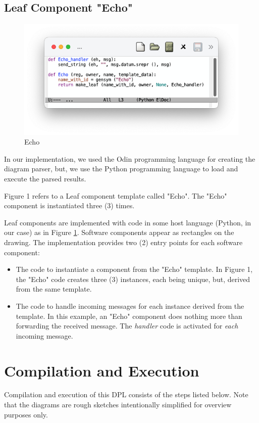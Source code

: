 \documentclass[10pt,anonymous,review]{acmart}
\begin{document}
\subsection{Leaf Component "Echo"}
\begin{figure}
    \includegraphics[trim=1.7cm 2cm 1.7cm 1.5cm, clip, scale=0.4]{./media/echo.png}
    \caption{Echo}
    \label{fig:echo}
\end{figure}
In our implementation, we used the Odin programming language for
creating the diagram parser, but, we use the Python programming
language to load and execute the parsed results.

Figure 1 refers to a Leaf component template called "Echo". The "Echo"
component is instantiated three (3) times. 

Leaf components are
implemented with code in some host language (Python, in our case) as in Figure \ref{fig:echo}. Software components
appear as rectangles on the drawing. The implementation provides two (2)
entry points for each software component:
\begin{itemize}
\item The code to instantiate a component from the "Echo" template. In Figure
1, the "Echo" code creates three (3) instances, each being unique, but,
derived from the same template.

\item The code to handle incoming messages for each instance derived from the
template. In this example, an "Echo" component does nothing more than
forwarding the received message. The \emph{handler} code is activated for
\emph{each} incoming message.
\end{itemize}

\section{Compilation and Execution}
Compilation and execution of this DPL consists of the steps listed below. Note that the diagrams are rough sketches intentionally simplified
for overview purposes only.
\end{document}
